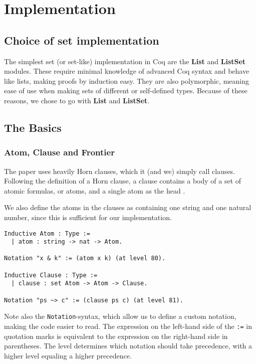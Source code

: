 \chapter{Implementation}

\section{Choice of set implementation}

The simplest set (or set-like) implementation in Coq are the \textbf{List} and \textbf{ListSet} modules.
These require minimal knowledge of advanced Coq syntax and behave like lists, making proofs by induction easy.
They are also polymorphic, meaning ease of use when making sets of different or self-defined types.
Because of these reasons, we chose to go with \textbf{List} and \textbf{ListSet}.

\section{The Basics}
\subsection{Atom, Clause and Frontier}

The paper \cite{mbezem} uses heavily Horn clauses, which it (and we) simply call clauses.
Following the definition of a Horn clause, a clause contains a body of a set of atomic formulas,
or atoms, and a single atom as the head \cite{halbert}.

We also define the atoms in the clauses as containing one string and one natural number,
since this is sufficient for our implementation.

\begin{minipage}{\linewidth}
\begin{lstlisting}[language=Coq, label={lst:atom_clause_def}, caption={Def. of \lstinline{Atom} and \lstinline{Clause} in Coq}]
Inductive Atom : Type :=
  | atom : string -> nat -> Atom.

Notation "x & k" := (atom x k) (at level 80).

Inductive Clause : Type :=
  | clause : set Atom -> Atom -> Clause.

Notation "ps ~> c" := (clause ps c) (at level 81).
\end{lstlisting}
\end{minipage}

Note also the \lstinline{Notation}-syntax, which allow us to define a custom notation,
making the code easier to read. The expression on the left-hand side of the \lstinline{:=} in quotation marks
is equivalent to the expression on the right-hand side in parentheses.
The level determines which notation should take precedence, with a higher level equaling a higher precedence.

